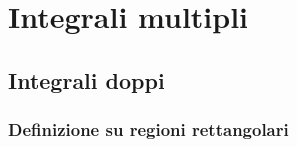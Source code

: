 \documentclass[a4paper]{article}
\begin{document}
	\newpage

	\section{Integrali multipli}\label{section: integrali multipli}

	\subsection{Integrali doppi}\label{subsection: integrali doppi}

	\subsubsection{Definizione su regioni rettangolari}\label{subsubsection: definizione su regioni rettangolari}
\end{document}
